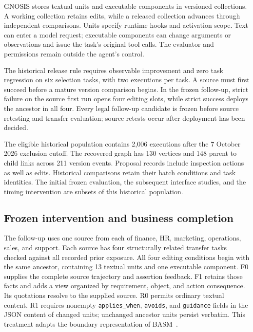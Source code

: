 \documentclass{ecai}
\newcommand{\Gnosis}{GNOSIS}
\begin{document}
\Gnosis{} stores textual units and executable components in versioned collections. A working collection retains edits, while a released collection advances through independent comparisons. Units specify runtime hooks and activation scope. Text can enter a model request; executable components can change arguments or observations and issue the task's original tool calls. The evaluator and permissions remain outside the agent's control.

The historical release rule requires observable improvement and zero task regression on six selection tasks, with two executions per task. A source must first succeed before a mature version comparison begins. In the frozen follow-up, strict failure on the source first run opens four editing slots, while strict success deploys the ancestor in all four. Every legal follow-up candidate is frozen before source retesting and transfer evaluation; source retests occur after deployment has been decided.

The eligible historical population contains 2,006 executions after the 7 October 2026 exclusion cutoff. The recovered graph has 130 vertices and 148 parent to child links across 211 version events. Proposal records include inspection actions as well as edits. Historical comparisons retain their batch conditions and task identities. The initial frozen evaluation, the subsequent interface studies, and the timing intervention are subsets of this historical population.

\subsection{Frozen intervention and business completion}

The follow-up uses one source from each of finance, HR, marketing, operations, sales, and support. Each source has four structurally related transfer tasks checked against all recorded prior exposure. All four editing conditions begin with the same ancestor, containing 13 textual units and one executable component. F0 supplies the complete source trajectory and assertion feedback. F1 retains those facts and adds a view organized by requirement, object, and action consequence. Its quotations resolve to the supplied source. R0 permits ordinary textual content. R1 requires nonempty \texttt{applies\_when}, \texttt{avoids}, and \texttt{guidance} fields in the JSON content of changed units; unchanged ancestor units persist verbatim. This treatment adapts the boundary representation of BASM~\cite{lin2026basm}.
\end{document}
